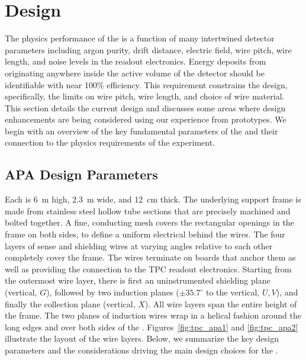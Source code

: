 \section{Design}
\label{sec:fdsp-apa-design}

The physics performance of the  is a function of many intertwined detector parameters including argon purity, drift distance, electric field, wire pitch, wire length, and noise levels in the readout electronics.  Energy deposits from   %
originating anywhere inside the active volume of the detector should be identifiable with near \num{100}\% efficiency.  This requirement constrains the  design, specifically, the limits on wire pitch, wire length, and choice of wire material.  This section details the current %
 design and discusses some areas where design enhancements are being considered using our experience from prototypes.  We begin with an overview of the key fundamental parameters of the  and their connection to the physics requirements of the experiment. 


\subsection{APA Design Parameters}
\label{sec:fdsp-apa-design-overview}

Each  is \SI{6}{m} high, \SI{2.3}{m} wide, and \SI{12}{cm} thick.  The underlying support frame is made from stainless steel hollow tube sections that are precisely machined and bolted together. A fine, conducting mesh covers the rectangular openings in the frame on both sides, to define a uniform electrical  behind the wires. The four layers of sense and shielding wires at varying angles relative to each other completely cover the frame. The wires terminate on boards that anchor them as well as providing the connection to the TPC readout electronics. Starting from the outermost wire layer, there is first an uninstrumented shielding plane (vertical, $G$), followed by two induction planes ($\pm 35.7^{\circ}$ to the vertical, $U,V$), and finally the collection plane (vertical, $X$). All wire layers span the entire height of the  frame. The two planes of induction wires wrap in a helical fashion around the long edges and over both sides of the . Figures~\ref{fig:tpc_apa1} and \ref{fig:tpc_apa2} illustrate the layout of the wire layers.  Below, we summarize the key design parameters and the considerations driving the main design choices for the .  %

